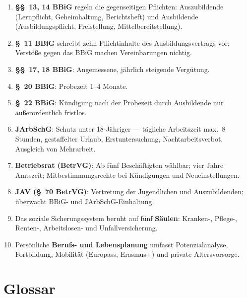 \documentclass[11pt, a4paper]{article}
\begin{document}
\begin{enumerate}
  \item \textbf{§§~13, 14 BBiG} regeln die gegenseitigen Pflichten: Auszubildende (Lernpflicht, Geheimhaltung, Berichtsheft) und Ausbildende (Ausbildungspflicht, Freistellung, Mittelbereitstellung).
  \item \textbf{§~11 BBiG} schreibt zehn Pflichtinhalte des Ausbildungsvertrags vor; Verstöße gegen das BBiG machen Vereinbarungen nichtig.
  \item \textbf{§§~17, 18 BBiG}: Angemessene, jährlich steigende Vergütung.
  \item \textbf{§~20 BBiG}: Probezeit 1–4 Monate.
  \item \textbf{§~22 BBiG}: Kündigung nach der Probezeit durch Ausbildende nur außerordentlich fristlos.
  \item \textbf{JArbSchG}: Schutz unter 18-Jähriger --- tägliche Arbeitszeit max.\ 8 Stunden, gestaffelter Urlaub, Erstuntersuchung, Nachtarbeitsverbot, Ausgleich von Mehrarbeit.
  \item \textbf{Betriebsrat (BetrVG)}: Ab fünf Beschäftigten wählbar; vier Jahre Amtszeit; Mitbestimmungsrechte bei Kündigungen und Neueinstellungen.
  \item \textbf{JAV (§~70 BetrVG)}: Vertretung der Jugendlichen und Auszubildenden; überwacht BBiG- und JArbSchG-Einhaltung.
  \item Das soziale Sicherungssystem beruht auf fünf \textbf{Säulen}: Kranken-, Pflege-, Renten-, Arbeitslosen- und Unfallversicherung.
  \item Persönliche \textbf{Berufs- und Lebensplanung} umfasst Potenzialanalyse, Fortbildung, Mobilität (Europass, Erasmus+) und private Altersvorsorge.
\end{enumerate}

\newpage

\section*{Glossar}



\end{document}
